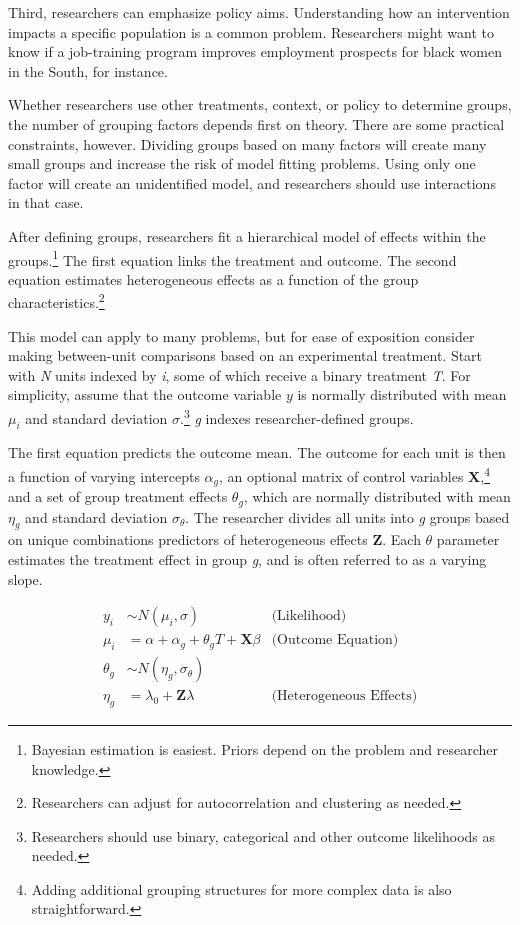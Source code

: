 \documentclass[12pt]{article}
\begin{document}
Third, researchers can emphasize policy aims.
Understanding how an intervention impacts a specific population is a common problem.
Researchers might want to know if a job-training program improves employment prospects for black women in the South, for instance.  


Whether researchers use other treatments, context, or policy to determine groups, the number of grouping factors depends first on theory.
There are some practical constraints, however.
Dividing groups based on many factors will create many small groups and increase the risk of model fitting problems. 
Using only one factor will create an unidentified model, and researchers should use interactions in that case. 


After defining groups, researchers fit a hierarchical model of effects within the groups.\footnote{Bayesian estimation is easiest. Priors depend on the problem and researcher knowledge.} 
The first equation links the treatment and outcome. 
The second equation estimates heterogeneous effects as a function of the group characteristics.\footnote{Researchers can adjust for autocorrelation and clustering as needed.}  


This model can apply to many problems, but for ease of exposition consider making between-unit comparisons based on an experimental treatment.    
Start with \textit{N} units indexed by \textit{i}, some of which receive a binary treatment \textit{T}.
For simplicity, assume that the outcome variable ${y}$ is normally distributed with mean $\mu_i$ and standard deviation $\sigma$.\footnote{Researchers should use binary, categorical and other outcome likelihoods as needed.}
\textit{g} indexes researcher-defined groups. 


The first equation predicts the outcome mean. 
The outcome for each unit is then a function of varying intercepts $\alpha_g$, an optional matrix of control variables \textbf{X},\footnote{Adding additional grouping structures for more complex data is also straightforward.} and a set of group treatment effects $\theta_g$, which are normally distributed with mean $\eta_g$ and standard deviation $\sigma_\theta$. 
The researcher divides all units into \textit{g} groups based on unique combinations predictors of heterogeneous effects \textbf{Z}. 
Each $\theta$ parameter estimates the treatment effect in group \textit{g}, and is often referred to as a varying slope. 


\begin{equation}
\begin{aligned}
y_i &\sim N(\mu_i, \sigma) &\text{(Likelihood)} \\
\mu_i &= \alpha + \alpha_g + \theta_g \textit{T} + \textbf{X} \beta &\text{(Outcome Equation)}  \\
\theta_g &\sim N(\eta_g, \sigma_\theta) \\ 
\eta_g &= \lambda_0 + \textbf{Z} \lambda &\text{(Heterogeneous Effects)} 
\end{aligned}
\end{equation}
\end{document}
